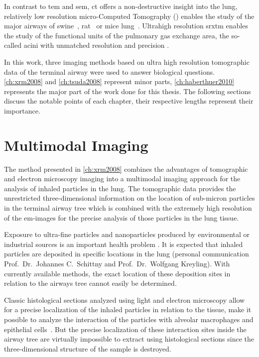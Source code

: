 In contrast to \ac{tem} and \ac{sem}, \ac{ct} offers a non-destructive insight into the lung, relatively low resolution micro-Com\-put\-ed Tomography () enables the study of the major airways of swine~\cite{Litzlbauer2006}, rat~\cite{Langheinrich2004a,Sharif2010} or mice lung~\cite{Langheinrich2004,Ritman2005}. Ultrahigh resolution \ac{srxtm} enables the study of the functional units of the pulmonary gas exchange area, the so-called acini with unmatched resolution and precision \cite{Tsuda2008,Haberthuer2010}.

In this work, three imaging methods based on ultra high resolution tomographic data of the terminal airway were used to answer biological questions. \autoref{ch:xrm2008} and \autoref{ch:tsuda2008} represent minor parts, \autoref{ch:haberthuer2010} represents the major part of the work done for this thesis. The following sections discuss the notable points of each chapter, their respective lengths represent their importance.

\section{Multimodal Imaging}\label{sec:multimodal imaging}
The method presented in \autoref{ch:xrm2008} combines the advantages of tomographic and electron microscopy imaging into a multimodal imaging approach for the analysis of inhaled particles in the lung. The tomographic data provides the unrestricted three-dimensional information on the location of sub-micron particles in the terminal airway tree which is combined with the extremely high resolution of the \ac{em}-images for the precise analysis of those particles in the lung tissue.

Exposure to ultra-fine particles and nanoparticles produced by environmental or industrial sources is an important health problem \cite{Gwinn2006}. It is expected that inhaled particles are deposited in specific locations in the lung (personal communication Prof.\ Dr.\ Johannes C.\ Schittny and Prof.\ Dr.\ Wolfgang Kreyling). With currently available methods, the exact location of these deposition sites in relation to the airways tree cannot easily be determined. 

Classic histological sections analyzed using light and electron microscopy allow for a precise localization of the inhaled particles in relation to the tissue, \ie make it possible to analyze the interaction of the particles with alveolar macrophages and epithelial cells~\cite{Muhlfeld2008}. But the precise localization of these interaction sites inside the airway tree are virtually impossible to extract using histological sections since the three-dimensional structure of the sample is destroyed.

